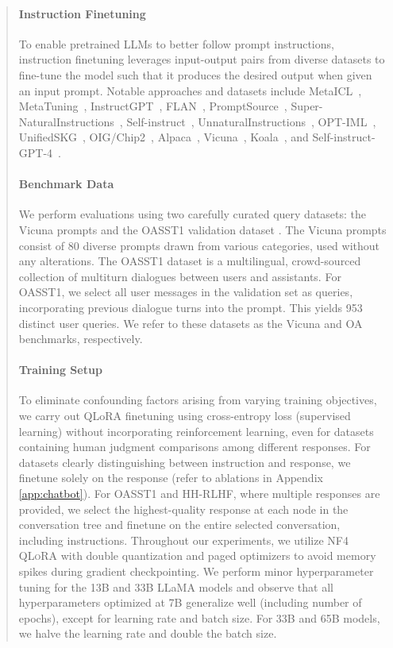 \begin{quote}
\paragraph{Instruction Finetuning} To enable pretrained LLMs to better follow prompt instructions, instruction finetuning leverages input-output pairs from diverse datasets to fine-tune the model such that it produces the desired output when given an input prompt. Notable approaches and datasets include MetaICL~\citep{min2021metaicl}, MetaTuning~\citep{zhong2021adapting}, InstructGPT~\citep{ouyang2022training}, FLAN~\citep{wei2021finetuned,chung2022scaling}, PromptSource~\citep{bach2022promptsource}, Super-NaturalInstructions~\citep{wang2022super,sanh2021multitask}, Self-instruct~\citep{wang2022self}, UnnaturalInstructions~\citep{honovich2022unnatural}, OPT-IML~\citep{iyer2022opt}, UnifiedSKG~\citep{xie2022unifiedskg}, OIG/Chip2~\citep{laion2023}, Alpaca~\citep{alpaca}, Vicuna~\citep{vicuna2023}, Koala~\citep{koala_blogpost_2023}, and Self-instruct-GPT-4~\citep{peng2023instruction}.

\paragraph{Benchmark Data} We perform evaluations using two carefully curated query datasets: the Vicuna prompts \citep{vicuna2023} and the OASST1 validation dataset \citep{kopf2023openassistant}. The Vicuna prompts consist of 80 diverse prompts drawn from various categories, used without any alterations. The OASST1 dataset is a multilingual, crowd-sourced collection of multiturn dialogues between users and assistants. For OASST1, we select all user messages in the validation set as queries, incorporating previous dialogue turns into the prompt. This yields 953 distinct user queries. We refer to these datasets as the Vicuna and OA benchmarks, respectively.

\paragraph{Training Setup} To eliminate confounding factors arising from varying training objectives, we carry out QLoRA finetuning using cross-entropy loss (supervised learning) without incorporating reinforcement learning, even for datasets containing human judgment comparisons among different responses. For datasets clearly distinguishing between instruction and response, we finetune solely on the response (refer to ablations in Appendix \ref{app:chatbot}). For OASST1 and HH-RLHF, where multiple responses are provided, we select the highest-quality response at each node in the conversation tree and finetune on the entire selected conversation, including instructions. Throughout our experiments, we utilize NF4 \textsc{QLoRA} with double quantization and paged optimizers to avoid memory spikes during gradient checkpointing. We perform minor hyperparameter tuning for the 13B and 33B LLaMA models and observe that all hyperparameters optimized at 7B generalize well (including number of epochs), except for learning rate and batch size. For 33B and 65B models, we halve the learning rate and double the batch size.


\end{quote}

